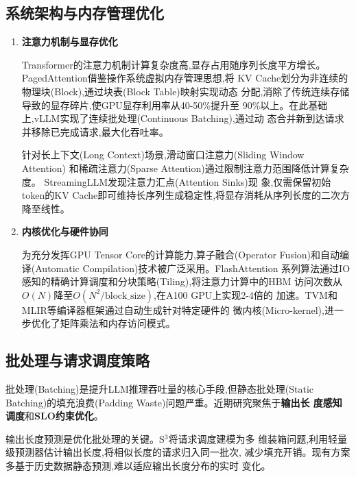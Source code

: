 \subsection{系统架构与内存管理优化}

\begin{enumerate}

\item \textbf{注意力机制与显存优化}

Transformer的注意力机制计算复杂度高,显存占用随序列长度平方增长。
PagedAttention\cite{kwon2023efficient}借鉴操作系统虚拟内存管理思想,将
KV Cache划分为非连续的物理块(Block),通过块表(Block Table)映射实现动态
分配,消除了传统连续存储导致的显存碎片,使GPU显存利用率从40-50\%提升至
90\%以上。在此基础上,vLLM实现了连续批处理(Continuous Batching),通过动
态合并新到达请求并移除已完成请求,最大化吞吐率。

针对长上下文(Long Context)场景,滑动窗口注意力(Sliding Window Attention)
和稀疏注意力(Sparse Attention)通过限制注意力范围降低计算复杂度。
StreamingLLM\cite{xiao2023streamingllm}发现注意力汇点(Attention Sinks)现
象,仅需保留初始token的KV Cache即可维持长序列生成稳定性,将显存消耗从序列长度的二次方降至线性。

\item \textbf{内核优化与硬件协同}

为充分发挥GPU Tensor Core的计算能力,算子融合(Operator Fusion)和自动编
译(Automatic Compilation)技术被广泛采用。FlashAttention\cite{dao2022flashattention}
系列算法通过IO感知的精确计算调度和分块策略(Tiling),将注意力计算中的HBM
访问次数从$O(N)$降至$O(N^2/\text{block\_size})$,在A100 GPU上实现2-4倍的
加速。TVM\cite{chen2018tvm}和MLIR等编译器框架通过自动生成针对特定硬件的
微内核(Micro-kernel),进一步优化了矩阵乘法和内存访问模式。

\end{enumerate}

\subsection{批处理与请求调度策略}

批处理(Batching)是提升LLM推理吞吐量的核心手段,但静态批处理(Static
Batching)的填充浪费(Padding Waste)问题严重。近期研究聚焦于\textbf{输出长
度感知调度}和\textbf{SLO约束优化}。

输出长度预测是优化批处理的关键。S$^3$\cite{jin2023s3}将请求调度建模为多
维装箱问题,利用轻量级预测器估计输出长度,将相似长度的请求归入同一批次,
减少填充开销。现有方案多基于历史数据静态预测,难以适应输出长度分布的实时
变化。

